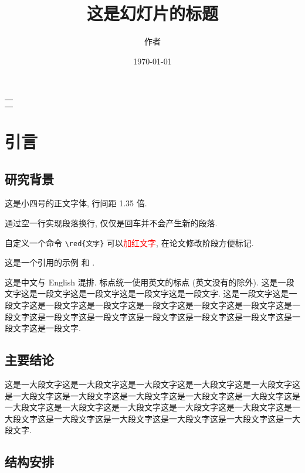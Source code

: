 \documentclass[UTF8,openany]{ctexbook}
\title{这是幻灯片的标题}
\author{作者}
\date{\today}
\makeatletter
\numberwithin{equation}{chapter}
\numberwithin{figure}{chapter}
\numberwithin{table}{chapter}
\renewcommand*{\maketitle}{
    \begin{titlepage}
    \thispagestyle{plain}
    \setcounter{page}{0}
    \vspace*{2.5\baselineskip}
    \begin{center}
        {\bfseries\huge \@title}
    \end{center}
    \vspace*{1\baselineskip}
    \begin{center}
        \Large\kaishu
        \begin{tabular}{c}
        \@author \\[5pt]
        \@date \\
        \end{tabular}
    \end{center}
    \vfill
\end{titlepage}
\restoregeometry
}
\theoremstyle{mystyle}
\newcommand{\red}[1]{\textcolor{red}{#1}}
\makeatother
\begin{document}

\maketitle


\tableofcontents
\clearpage



\chapter{引言}

\section{研究背景}\label{sec:1-1}

这是小四号的正文字体, 行间距 1.35 倍.

通过空一行实现段落换行, 仅仅是回车并不会产生新的段落.

自定义一个命令 \verb|\red{文字}| 可以\red{加红文字}, 在论文修改阶段方便标记.

这是一个引用的示例 \cite{Tadmor2012} 和 \cite{LiLiu1997,Adams2003,TreWei2014}.

这是中文与 English 混排. 标点统一使用英文的标点 (英文没有的除外). 这是一段文字这是一段文字这是一段文字这是一段文字这是一段文字. 这是一段文字这是一段文字这是一段文字这是一段文字这是一段文字这是一段文字这是一段文字这是一段文字这是一段文字这是一段文字这是一段文字这是一段文字这是一段文字这是一段文字这是一段文字.

\section{主要结论}\label{sec:1-2}

这是一大段文字这是一大段文字这是一大段文字这是一大段文字这是一大段文字这是一大段文字这是一大段文字这是一大段文字这是一大段文字这是一大段文字这是一大段文字这是一大段文字这是一大段文字这是一大段文字这是一大段文字这是一大段文字这是一大段文字这是一大段文字这是一大段文字这是一大段文字这是一大段文字.


\section{结构安排}\label{sec:1-3}
\end{document}
